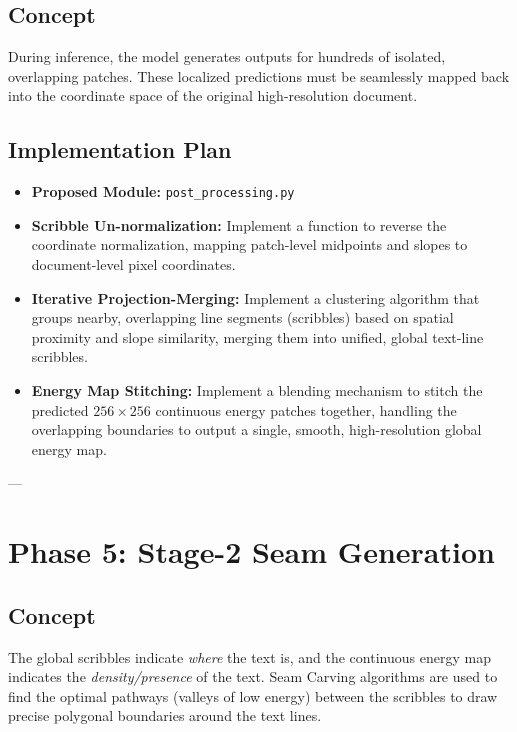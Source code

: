 \documentclass[12pt,a4paper]{article}
\begin{document}
\subsection{Concept}
During inference, the model generates outputs for hundreds of isolated, overlapping patches. These localized predictions must be seamlessly mapped back into the coordinate space of the original high-resolution document.

\subsection{Implementation Plan}
\begin{itemize}
    \item \textbf{Proposed Module:} \texttt{post\_processing.py}
    \item \textbf{Scribble Un-normalization:} Implement a function to reverse the coordinate normalization, mapping patch-level midpoints and slopes to document-level pixel coordinates.
    \item \textbf{Iterative Projection-Merging:} Implement a clustering algorithm that groups nearby, overlapping line segments (scribbles) based on spatial proximity and slope similarity, merging them into unified, global text-line scribbles.
    \item \textbf{Energy Map Stitching:} Implement a blending mechanism to stitch the predicted $256 \times 256$ continuous energy patches together, handling the overlapping boundaries to output a single, smooth, high-resolution global energy map.
\end{itemize}

---

\section{Phase 5: Stage-2 Seam Generation}

\subsection{Concept}
The global scribbles indicate \textit{where} the text is, and the continuous energy map indicates the \textit{density/presence} of the text. Seam Carving algorithms are used to find the optimal pathways (valleys of low energy) between the scribbles to draw precise polygonal boundaries around the text lines.
\end{document}
